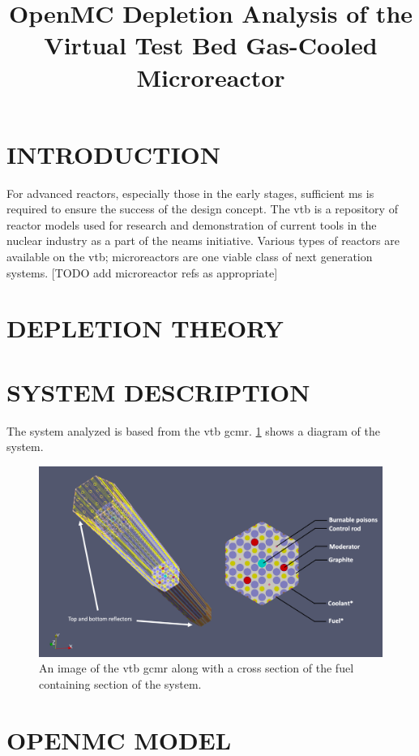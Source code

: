 \documentclass[letterpaper]{physor2024}
\title{OpenMC Depletion Analysis of the Virtual Test Bed Gas-Cooled Microreactor}
\begin{document}
\section{INTRODUCTION}\label{sec:intro}
For advanced reactors, especially those in the early stages, sufficient \gls{ms} is required to ensure the success of the design concept. The \gls{vtb} \cite{vtb2023} is a repository of reactor models used for research and demonstration of current tools in the nuclear industry as a part of the \gls{neams} initiative. Various types of reactors are available on the \gls{vtb}; microreactors are one viable class of next generation systems. [TODO add microreactor refs as appropriate]


\section{DEPLETION THEORY}\label{sec:depletion}

\section{SYSTEM DESCRIPTION}\label{sec:system}
The system analyzed is based from the \gls{vtb} \gls{gcmr}. \cref{fig:vtb_gcmr} shows a diagram of the system.
\cite{openmc}

\begin{figure}[H]
    \centering
    \includegraphics[width=\linewidth]{figures/vtb_gcmr_diagram.jpg}
    \caption{An image of the \gls{vtb} \gls{gcmr} along with a cross section of the fuel containing section of the system.}
    \label{fig:vtb_gcmr}
\end{figure}


\section{OPENMC MODEL}\label{sec:openmc_model}
\end{document}
